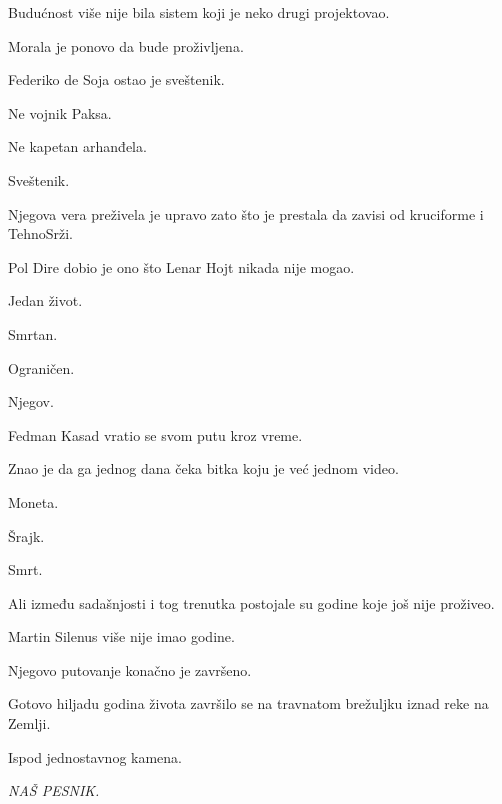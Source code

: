Budućnost više nije bila sistem koji je neko drugi projektovao.

\bigskip

Morala je ponovo da bude proživljena.

\bigskip

Federiko de Soja ostao je sveštenik.

\bigskip

Ne vojnik Paksa.

Ne kapetan arhanđela.

\bigskip

Sveštenik.

\bigskip

Njegova vera preživela je upravo zato što je prestala da zavisi od kruciforme i TehnoSrži.

\bigskip

Pol Dire dobio je ono što Lenar Hojt nikada nije mogao.

\bigskip

Jedan život.

\bigskip

Smrtan.

Ograničen.

Njegov.

\bigskip

Fedman Kasad vratio se svom putu kroz vreme.

\bigskip

Znao je da ga jednog dana čeka bitka koju je već jednom video.

\bigskip

Moneta.

Šrajk.

Smrt.

\bigskip

Ali između sadašnjosti i tog trenutka postojale su godine koje još nije proživeo.

\bigskip

Martin Silenus više nije imao godine.

\bigskip

Njegovo putovanje konačno je završeno.

\bigskip

Gotovo hiljadu godina života završilo se na travnatom brežuljku iznad reke na Zemlji.

\bigskip

Ispod jednostavnog kamena.

\bigskip

\emph{NAŠ PESNIK.}

\bigskip

